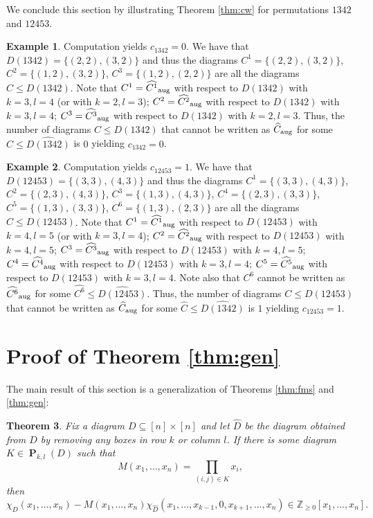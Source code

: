 \documentclass{amsart}
\newtheorem{theorem}{Theorem}[section]
\theoremstyle{definition}
\newtheorem{example}[theorem]{Example}
\theoremstyle{named}
\def\Z{\mathbb{Z}}
\DeclareMathOperator*{\Purple}{\mathbf{P}}
\begin{document}
	We conclude this section by illustrating Theorem \ref{thm:cw}  for permutations $1342$ and $12453$. 

\begin{example} Computation yields $c_{1342}=0$. We have that $D(1342)=\{(2,2), (3,2)\}$ and thus the diagrams $C^1=\{(2,2), (3,2)\}$, $C^2=\{(1,2), (3,2)\}$, $C^3=\{(1,2), (2,2)\}$ are all the diagrams $C\leq D(1342)$.  Note that $C^1=\widehat{C^1}_\textup{aug}$ with respect to $D(1342)$ with $k=3, l=4$ (or with $k=2, l=3$); $C^2=\widehat{C^2}_\textup{aug}$ with respect to $D(1342)$ with $k=3, l=4$; $C^3=\widehat{C^3}_\textup{aug}$ with respect to $D(1342)$ with $k=2, l=3$. Thus, the number of diagrams $C \le D(1342)$ that cannot be written as $\widehat{C}_\textup{aug}$ for some $\widehat{C} \le \widehat{D(1342)}$ is $0$ yielding $c_{1342}=0$.
\end{example}

\begin{example} Computation yields $c_{12453}=1$. We have that $D(12453)=\{(3,3), (4,3)\}$ and thus the diagrams $C^1 = \{(3,3), (4,3)\}$, $C^2 = \{(2,3), (4,3)\}$, $C^3 = \{(1,3), (4,3)\}$, $C^4 = \{(2,3), (3,3)\}$, $C^5 = \{(1,3), (3,3)\}$, $C^6 = \{(1,3), (2,3)\}$ are all the diagrams $C\leq D(12453)$.   Note that $C^1=\widehat{C^1}_\textup{aug}$ with respect to $D(12453)$ with $k=4, l=5$ (or with $k=3, l=4$); $C^2=\widehat{C^2}_\textup{aug}$ with respect to  $D(12453)$ with $k=4, l=5$; $C^3=\widehat{C^3}_\textup{aug}$ with respect to  $D(12453)$ with $k=4, l=5$; $C^4=\widehat{C^4}_\textup{aug}$ with respect to  $D(12453)$ with $k=3, l=4$;  $C^5=\widehat{C^5}_\textup{aug}$ with respect to  $D(12453)$ with $k=3, l=4$.  Note also that $C^6$ cannot be written as $\widehat{C^6}_\textup{aug}$ for some $\widehat{C^6} \le \widehat{D(12453)}$.  Thus, the number of diagrams $C \le D(12453)$ that cannot be written as $\widehat{C}_\textup{aug}$ for some $\widehat{C} \le \widehat{D(1342)}$ is $1$ yielding $c_{12453}=1$.

\end{example}

	\section{Proof of Theorem \ref{thm:gen}}
	\label{sec:gen}
	The main result of this section is a generalization of Theorems \ref{thm:fms} and \ref{thm:gen}:		 

\begin{theorem}\label{thm:gen1} 
Fix a diagram $D \subseteq [n] \times [n]$ and let $\widehat{D}$ be the diagram obtained from $D$ by removing any boxes in row $k$ or column $l$. If there is some diagram $K \in \Purple_{k, l}(D)$ such that
\[
M(x_1, \dots, x_n) = \prod_{(i, j) \in K} x_i,
\]
then  \[
\chi_D(x_1, \dots, x_n) - M(x_1, \dots, x_n) \chi_{\widehat{D}}(x_1, \dots, x_{k-1}, 0, x_{k+1}, \dots, x_n)  \in \Z_{\ge0}[x_1, \dots, x_n].\]
\end{theorem}
\end{document}
